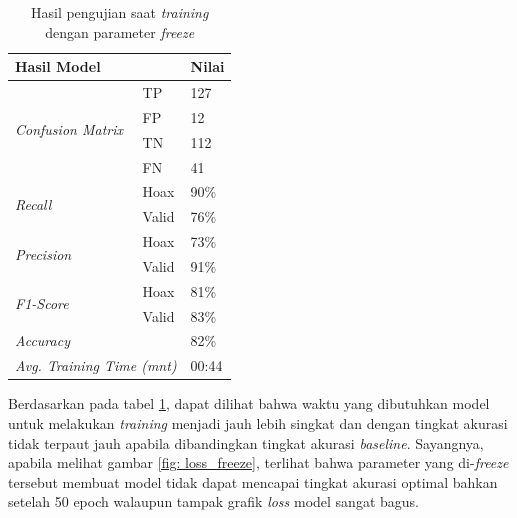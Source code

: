 \begin{table}[h]
    \caption{Hasil pengujian saat \textit{training} dengan parameter \textit{freeze}}
    \label{tab: loss_freeze}
    \centering
    \begin{tabular}{|l|l|l|}
        \hline
        \multicolumn{2}{|l|}{\textbf{Hasil Model}}              & \textbf{Nilai}        \\ \hline
        \multirow{4}{*}{\textit{Confusion Matrix}}              & TP             & 127  \\ \cline{2-3}
                                                                & FP             & 12   \\ \cline{2-3}
                                                                & TN             & 112  \\ \cline{2-3}
                                                                & FN             & 41   \\ \hline
        \multirow{2}{*}{\textit{Recall}}                        & Hoax           & 90\% \\ \cline{2-3}
                                                                & Valid          & 76\% \\ \hline
        \multirow{2}{*}{\textit{Precision}}                     & Hoax           & 73\% \\ \cline{2-3}
                                                                & Valid          & 91\% \\ \hline
        \multirow{2}{*}{\textit{F1-Score}}                      & Hoax           & 81\% \\ \cline{2-3}
                                                                & Valid          & 83\% \\ \hline
        \multicolumn{2}{|l|}{\textit{Accuracy}}                 & 82\%                  \\ \hline
        \multicolumn{2}{|l|}{\textit{Avg. Training Time (mnt)}} & 00:44                 \\ \hline
    \end{tabular}
\end{table}

Berdasarkan pada tabel \ref{tab: loss_freeze}, dapat dilihat bahwa waktu yang dibutuhkan model untuk melakukan \textit{training} menjadi jauh lebih singkat dan dengan tingkat akurasi tidak terpaut jauh apabila dibandingkan tingkat akurasi \textit{baseline}. Sayangnya, apabila melihat gambar \ref{fig: loss_freeze}, terlihat bahwa parameter yang di-\textit{freeze} tersebut membuat model tidak dapat mencapai tingkat akurasi optimal bahkan setelah 50 epoch walaupun tampak grafik \textit{loss} model sangat bagus.

